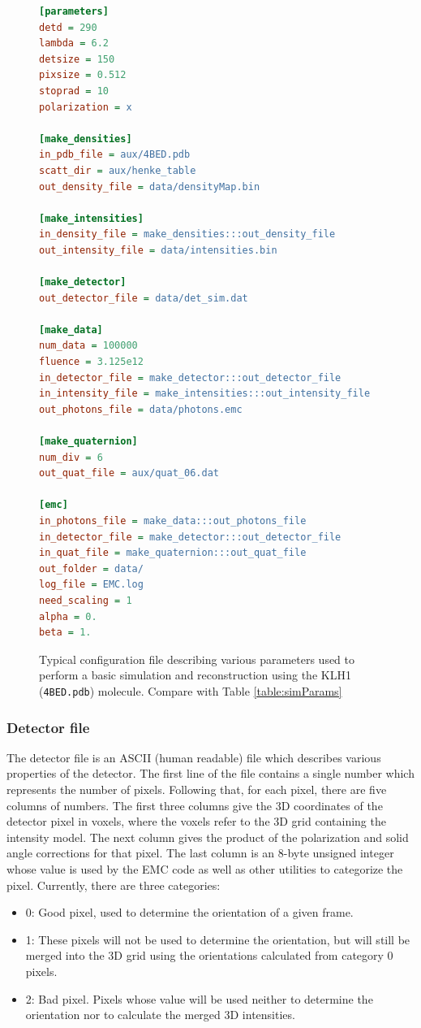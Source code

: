 \documentclass[]{iucr}              %
\begin{document}
\begin{figure}
\begin{lstlisting}[language=ini]
[parameters]
detd = 290
lambda = 6.2
detsize = 150
pixsize = 0.512
stoprad = 10
polarization = x

[make_densities]
in_pdb_file = aux/4BED.pdb
scatt_dir = aux/henke_table
out_density_file = data/densityMap.bin

[make_intensities]
in_density_file = make_densities:::out_density_file
out_intensity_file = data/intensities.bin

[make_detector]
out_detector_file = data/det_sim.dat

[make_data]
num_data = 100000
fluence = 3.125e12
in_detector_file = make_detector:::out_detector_file
in_intensity_file = make_intensities:::out_intensity_file
out_photons_file = data/photons.emc

[make_quaternion]
num_div = 6
out_quat_file = aux/quat_06.dat

[emc]
in_photons_file = make_data:::out_photons_file
in_detector_file = make_detector:::out_detector_file
in_quat_file = make_quaternion:::out_quat_file
out_folder = data/
log_file = EMC.log
need_scaling = 1
alpha = 0.
beta = 1.
\end{lstlisting}
\caption{Typical configuration file describing various parameters used to perform a basic simulation and reconstruction using the KLH1 (\texttt{4BED.pdb}) molecule. Compare with Table \ref{table:simParams}}
\label{fig:config}
\end{figure}

\subsubsection{Detector file}\label{subsubsec:detector}
The detector file is an ASCII (human readable) file which describes various properties of the detector. The first line of the file contains a single number which represents the number of pixels. Following that, for each pixel, there are five columns of numbers. The first three columns give the 3D coordinates of the detector pixel in voxels, where the voxels refer to the 3D grid containing the intensity model. The next column gives the product of the polarization and solid angle corrections for that pixel. The last column is an 8-byte unsigned integer whose value is used by the EMC code as well as other utilities to categorize the pixel. Currently, there are three categories:
\begin{itemize}
\item 0: Good pixel, used to determine the orientation of a given frame.
\item 1: These pixels will not be used to determine the orientation, but will still be merged into the 3D grid using the orientations calculated from category 0 pixels.
\item 2: Bad pixel. Pixels whose value will be used neither to determine the orientation nor to calculate the merged 3D intensities.
\end{itemize}
\end{document}

